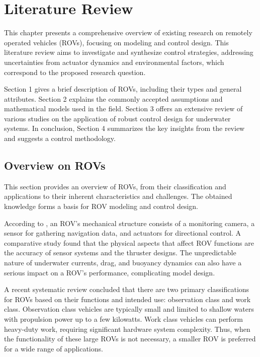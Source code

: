 \chapter{Literature Review}
\label{chap:lr}


This chapter presents a comprehensive overview of existing research on remotely operated vehicles (ROVs),
focusing on modeling and control design. This literature review aims to investigate and synthesize
control strategies, addressing uncertainties from actuator dynamics and environmental factors, which
correspond to the proposed research question.

Section 1 gives a brief description of ROVs, including their types and general attributes.
Section 2 explains the commonly accepted assumptions and mathematical models used in the field.
Section 3 offers an extensive review of various studies on the application of robust control
design for underwater systems. In conclusion, Section 4 summarizes the key insights from the review
and suggests a control methodology.

\section{Overview on ROVs}

    This section provides an overview of ROVs, from their classification and applications to their
    inherent characteristics and challenges. The obtained knowledge forms a basis for ROV modeling
    and control design.

    According to \cite{rov_review}, an ROV's mechanical structure consists of a monitoring camera, a sensor
    for gathering navigation data, and actuators for directional control. A
    comparative study \cite{overview} found that the physical aspects that affect ROV functions are the accuracy of
    sensor systems and the thruster designs. The unpredictable nature of underwater currents, drag,
    and buoyancy dynamics can also have a serious impact on a ROV's performance, complicating model
    design.

    A recent systematic review \cite{inspection_review} concluded that there are two primary classifications for ROVs based
    on their functions and intended use: observation class and work class. Observation class vehicles
    are typically small and limited to shallow waters with propulsion power up to a few kilowatts. Work
    class vehicles can perform heavy-duty work, requiring significant hardware
    system complexity. Thus, when the functionality of these large
    ROVs is not necessary, a smaller ROV is preferred for a wide range of applications.

